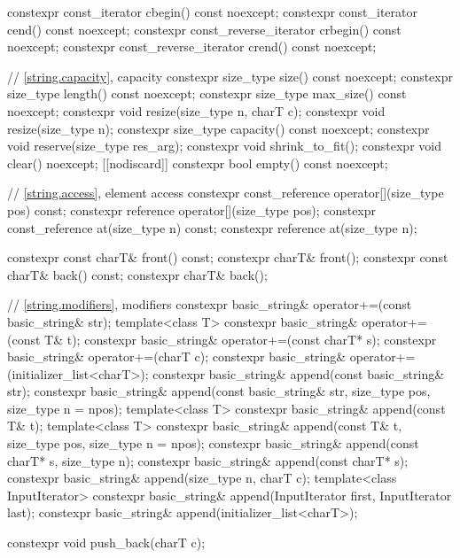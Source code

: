 \begin{codeblock}
{{    constexpr const_iterator         cbegin() const noexcept;
    constexpr const_iterator         cend() const noexcept;
    constexpr const_reverse_iterator crbegin() const noexcept;
    constexpr const_reverse_iterator crend() const noexcept;

    // \ref{string.capacity}, capacity
    constexpr size_type size() const noexcept;
    constexpr size_type length() const noexcept;
    constexpr size_type max_size() const noexcept;
    constexpr void resize(size_type n, charT c);
    constexpr void resize(size_type n);
    constexpr size_type capacity() const noexcept;
    constexpr void reserve(size_type res_arg);
    constexpr void shrink_to_fit();
    constexpr void clear() noexcept;
    [[nodiscard]] constexpr bool empty() const noexcept;

    // \ref{string.access}, element access
    constexpr const_reference operator[](size_type pos) const;
    constexpr reference       operator[](size_type pos);
    constexpr const_reference at(size_type n) const;
    constexpr reference       at(size_type n);

    constexpr const charT& front() const;
    constexpr charT&       front();
    constexpr const charT& back() const;
    constexpr charT&       back();

    // \ref{string.modifiers}, modifiers
    constexpr basic_string& operator+=(const basic_string& str);
    template<class T>
      constexpr basic_string& operator+=(const T& t);
    constexpr basic_string& operator+=(const charT* s);
    constexpr basic_string& operator+=(charT c);
    constexpr basic_string& operator+=(initializer_list<charT>);
    constexpr basic_string& append(const basic_string& str);
    constexpr basic_string& append(const basic_string& str, size_type pos, size_type n = npos);
    template<class T>
      constexpr basic_string& append(const T& t);
    template<class T>
      constexpr basic_string& append(const T& t, size_type pos, size_type n = npos);
    constexpr basic_string& append(const charT* s, size_type n);
    constexpr basic_string& append(const charT* s);
    constexpr basic_string& append(size_type n, charT c);
    template<class InputIterator>
      constexpr basic_string& append(InputIterator first, InputIterator last);
    constexpr basic_string& append(initializer_list<charT>);

    constexpr void push_back(charT c);

}}
\end{codeblock}
